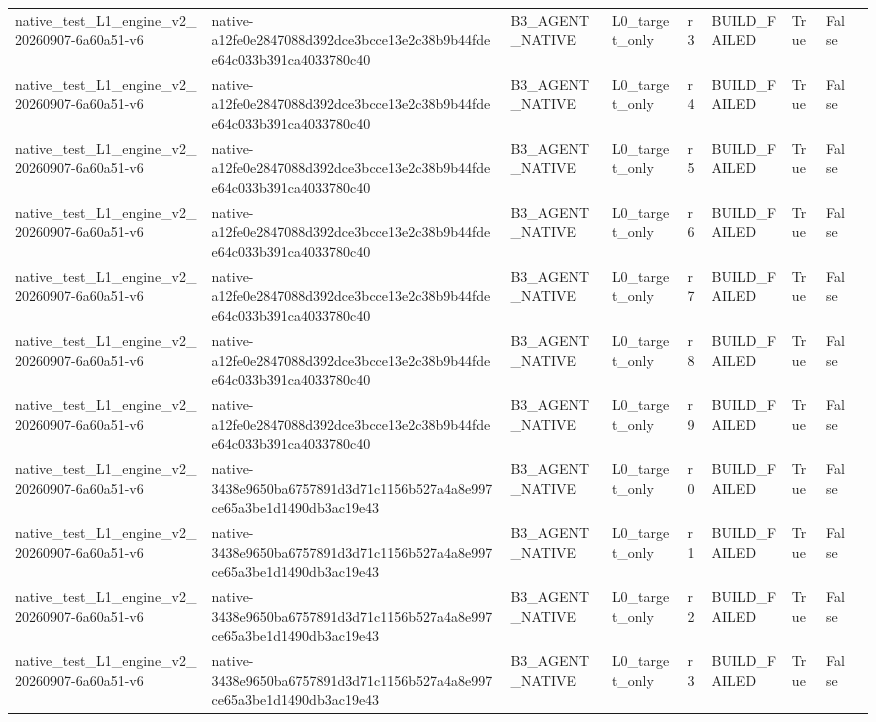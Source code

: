 \begin{tabular}{lllllllll}
native\_test\_L1\_engine\_v2\_20260907-6a60a51-v6 & native-a12fe0e2847088d392dce3bcce13e2c38b9b44fdee64c033b391ca4033780c40 & B3\_AGENT\_NATIVE & L0\_target\_only & r3 & BUILD\_FAILED & True & False &  \\
native\_test\_L1\_engine\_v2\_20260907-6a60a51-v6 & native-a12fe0e2847088d392dce3bcce13e2c38b9b44fdee64c033b391ca4033780c40 & B3\_AGENT\_NATIVE & L0\_target\_only & r4 & BUILD\_FAILED & True & False &  \\
native\_test\_L1\_engine\_v2\_20260907-6a60a51-v6 & native-a12fe0e2847088d392dce3bcce13e2c38b9b44fdee64c033b391ca4033780c40 & B3\_AGENT\_NATIVE & L0\_target\_only & r5 & BUILD\_FAILED & True & False &  \\
native\_test\_L1\_engine\_v2\_20260907-6a60a51-v6 & native-a12fe0e2847088d392dce3bcce13e2c38b9b44fdee64c033b391ca4033780c40 & B3\_AGENT\_NATIVE & L0\_target\_only & r6 & BUILD\_FAILED & True & False &  \\
native\_test\_L1\_engine\_v2\_20260907-6a60a51-v6 & native-a12fe0e2847088d392dce3bcce13e2c38b9b44fdee64c033b391ca4033780c40 & B3\_AGENT\_NATIVE & L0\_target\_only & r7 & BUILD\_FAILED & True & False &  \\
native\_test\_L1\_engine\_v2\_20260907-6a60a51-v6 & native-a12fe0e2847088d392dce3bcce13e2c38b9b44fdee64c033b391ca4033780c40 & B3\_AGENT\_NATIVE & L0\_target\_only & r8 & BUILD\_FAILED & True & False &  \\
native\_test\_L1\_engine\_v2\_20260907-6a60a51-v6 & native-a12fe0e2847088d392dce3bcce13e2c38b9b44fdee64c033b391ca4033780c40 & B3\_AGENT\_NATIVE & L0\_target\_only & r9 & BUILD\_FAILED & True & False &  \\
native\_test\_L1\_engine\_v2\_20260907-6a60a51-v6 & native-3438e9650ba6757891d3d71c1156b527a4a8e997ce65a3be1d1490db3ac19e43 & B3\_AGENT\_NATIVE & L0\_target\_only & r0 & BUILD\_FAILED & True & False &  \\
native\_test\_L1\_engine\_v2\_20260907-6a60a51-v6 & native-3438e9650ba6757891d3d71c1156b527a4a8e997ce65a3be1d1490db3ac19e43 & B3\_AGENT\_NATIVE & L0\_target\_only & r1 & BUILD\_FAILED & True & False &  \\
native\_test\_L1\_engine\_v2\_20260907-6a60a51-v6 & native-3438e9650ba6757891d3d71c1156b527a4a8e997ce65a3be1d1490db3ac19e43 & B3\_AGENT\_NATIVE & L0\_target\_only & r2 & BUILD\_FAILED & True & False &  \\
native\_test\_L1\_engine\_v2\_20260907-6a60a51-v6 & native-3438e9650ba6757891d3d71c1156b527a4a8e997ce65a3be1d1490db3ac19e43 & B3\_AGENT\_NATIVE & L0\_target\_only & r3 & BUILD\_FAILED & True & False &  \\

\end{tabular}
